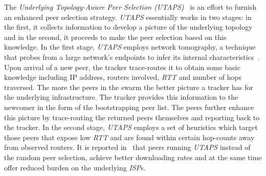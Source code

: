 The \emph{Underlying Topology-Aware Peer Selection (UTAPS)}~\cite{LCY2008}
is an effort to furnish an enhanced peer selection strategy.
\emph{UTAPS} essentially works in two stages: in the first,
it collects information to develop a picture of the underlying topology 
and in the second, it proceeds to make the peer selection based on 
this knowledge.
In the first stage, \emph{UTAPS} employs
network tomography, a technique that probes from a large network's 
endpoints to infer its internal characteristics~\cite{chny_tomography_2002}. 
Upon arrival of a new peer, the tracker trace-routes 
it to obtain some basic knowledge 
including IP address, routers involved, \emph{RTT} and number of 
hops traversed.
The more the peers in the swarm the better 
picture a tracker has for the underlying infrastructure.  
The tracker provides this information to the newcomer in the form
of the bootstrapping peer list. 
The peers further enhance this picture by
trace-routing the returned peers themselves and reporting back to the tracker.
In the second stage,  \emph{UTAPS} employs a set of heuristics
which target those peers that expose low \emph{RTT}
and are found within certain hop-counts away from 
observed routers. %
It is reported in~\cite{LCY2008} that peers running \emph{UTAPS}
instead of the random peer selection, achieve better downloading rates
and at the same time offer reduced burden on the underlying \emph{ISP}s. 
